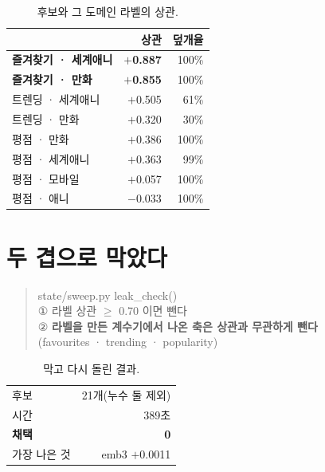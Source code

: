 \documentclass[10pt]{article}
\begin{document}
\begin{table}[t]
\centering\tsize
\caption{후보와 그 도메인 라벨의 상관.}
\begin{tabular}{lrr}
\toprule
& 상관 & 덮개율 \\
\midrule
\textbf{즐겨찾기 · 세계애니} & \textbf{$+$0.887} & 100\% \\
\textbf{즐겨찾기 · 만화} & \textbf{$+$0.855} & 100\% \\
\midrule
트렌딩 · 세계애니 & $+$0.505 & 61\% \\
트렌딩 · 만화 & $+$0.320 & 30\% \\
\midrule
평점 · 만화 & $+$0.386 & 100\% \\
평점 · 세계애니 & $+$0.363 & 99\% \\
평점 · 모바일 & $+$0.057 & 100\% \\
평점 · 애니 & $-$0.033 & 100\% \\
\bottomrule
\end{tabular}
\end{table}


\section{두 겹으로 막았다}

\begin{quote}\fontsize{9.0}{11}\selectfont\ttfamily
state/sweep.py \quad leak\_check()\\[.3em]
\rm ① 라벨 상관 $\ge$ 0.70 이면 뺀다\\
\rm ② \textbf{라벨을 만든 계수기에서 나온 축은 상관과 무관하게 뺀다}\\
\rm\hphantom{② }(favourites · trending · popularity)
\end{quote}

\begin{table}[t]
\centering\tsize
\caption{막고 다시 돌린 결과.}
\begin{tabular}{lr}
\toprule
후보 & 21개(누수 둘 제외) \\
시간 & 389초 \\
\textbf{채택} & \textbf{0} \\
가장 나은 것 & emb3 $+$0.0011 \\
\bottomrule
\end{tabular}
\end{table}
\end{document}
